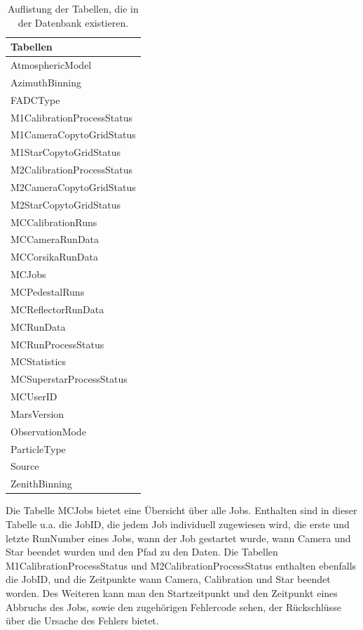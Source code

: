 \begin{table}[!h]
\centering
\caption{Auflistung der Tabellen, die in der Datenbank existieren.}
\label{MYSQL_Tabellen}
\begin{tabular}{l}
  \toprule
  Tabellen\\
  \midrule
  AtmosphericModel           \\
  AzimuthBinning             \\
  FADCType                   \\
  M1CalibrationProcessStatus \\
  M1CameraCopytoGridStatus   \\
  M1StarCopytoGridStatus     \\
  M2CalibrationProcessStatus \\
  M2CameraCopytoGridStatus   \\
  M2StarCopytoGridStatus     \\
  MCCalibrationRuns          \\
  MCCameraRunData            \\
  MCCorsikaRunData           \\
  MCJobs                     \\
  MCPedestalRuns             \\
  MCReflectorRunData         \\
  MCRunData                  \\
  MCRunProcessStatus         \\
  MCStatistics               \\
  MCSuperstarProcessStatus   \\
  MCUserID                   \\
  MarsVersion                \\
  ObservationMode            \\
  ParticleType               \\
  Source                     \\
  ZenithBinning   	     \\
  \bottomrule
\end{tabular}
\end{table}


Die Tabelle MCJobs bietet eine Übersicht über alle Jobs. 
Enthalten sind in dieser Tabelle u.a. die JobID, die jedem Job individuell zugewiesen wird, die erste und letzte RunNumber eines Jobs, wann der Job gestartet wurde, wann Camera und Star beendet wurden und den Pfad zu den Daten.\newline
Die Tabellen M1CalibrationProcessStatus und M2CalibrationProcessStatus enthalten ebenfalls die JobID, und die Zeitpunkte wann Camera, Calibration und Star beendet worden. 
Des Weiteren kann man den Startzeitpunkt und den Zeitpunkt eines Abbruchs des Jobs, sowie den zugehörigen Fehlercode sehen, der Rückschlüsse über die Ursache des Fehlers bietet.

